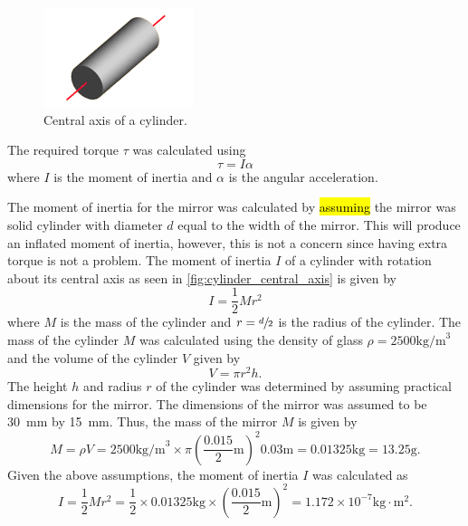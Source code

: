 \begin{figure}
    \centering
    \includegraphics[scale=1]{figures/cylinder_central_axis.png}
    \caption{Central axis of a cylinder.}
    \label{fig:cylinder_central_axis}
\end{figure}

The required torque $\tau$ was calculated using
\begin{equation}
    \tau = I\alpha
    \label{eq:torque}
\end{equation}
where $I$ is the moment of inertia and $\alpha$ is the angular acceleration.

The moment of inertia for the mirror was calculated by \hl{assuming} the mirror was solid cylinder with diameter $d$ equal to the width of the mirror. This will produce an inflated moment of inertia, however, this is not a concern since having extra torque is not a problem. The moment of inertia $I$ of a cylinder with rotation about its central axis as seen in \autoref{fig:cylinder_central_axis} is given by
\begin{equation}
    I = \frac{1}{2}Mr^2
    \label{eq:moment_of_inertia}
\end{equation}
where $M$ is the mass of the cylinder and $r = \sfrac{d}{2}$ is the radius of the cylinder. The mass of the cylinder $M$ was calculated using the density of glass $\rho = 2500 \text{kg/m}^3$ and the volume of the cylinder $V$ given by
\begin{equation}
    V = \pi r^2 h.
    \label{eq:cylinder_volume}
\end{equation}
The height $h$ and radius $r$ of the cylinder was determined by assuming practical dimensions for the mirror. The dimensions of the mirror was assumed to be 30~mm by 15~mm. Thus, the mass of the mirror $M$ is given by
\begin{equation}
    M = \rho V = 2500 \text{kg/m}^3 \times \pi \left(\frac{0.015}{2} \text{m}\right)^2 0.03 \text{m} = 0.01325 \text{kg} = 13.25 \text{g}.
    \label{eq:cylinder_mass}
\end{equation}
Given the above assumptions, the moment of inertia $I$ was calculated as
\begin{equation}
    I = \frac{1}{2}Mr^2 = \frac{1}{2} \times 0.01325 \text{kg} \times \left(\frac{0.015}{2} \text{m}\right)^2 = 1.172 \times 10^{-7} \text{kg} \cdot \text{m}^2.
    \label{eq:cylinder_moment_of_inertia}
\end{equation}

